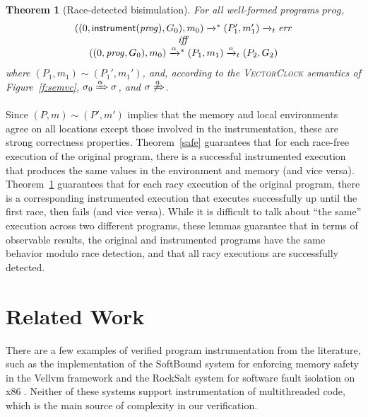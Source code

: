 \documentclass[preprint, 10pt]{sigplanconf}
\newcommand{\VCalg}{\textsc{VectorClock}\xspace}
\newcommand{\instrp}[1]{\ensuremath{\mathsf{instrument}(#1)}}
\newcommand{\cfg}[2]{\ensuremath{(#1, #2)}}
\newcommand{\execstar}[4]{\ensuremath{\cfg{#1}{#2} \tto{#3} #4}}
\newcommand{\execs}[3]{\ensuremath{ \xrightarrow{#2}_{#1} #3}}
\newcommand{\tto}[1]{\mathrel{
  \vphantom{\xrightarrow{#1}}
  \smash{\xrightarrow{#1}}
  \vphantom{\to}^{*}}
}
\newtheorem{theorem}{Theorem}
\begin{document}
\begin{theorem}[Race-detected bisimulation]\label{race}For all well-formed programs $\mathit{prog}$, 
\[
\begin{array}{c}
\execstar{(0, \instrp{\mathit{prog}}, G_0)}{m_0}{}{(P_1', m_1')} \execs{t}{}{\mathit{err}}\\ 
\mathit{iff} \\ 
\execstar{(0, \mathit{prog}, G_0)}{m_0}{\alpha}{(P_1, m_1)} \execs{t}{o}{(P_2, G_2)}
\end{array}
\]
%
where $(P_1, m_1) \sim (P_1', m_1')$, and, according to the \VCalg semantics of Figure~\ref{f:semvc}, $\sigma_0 \xRightarrow{\alpha} \sigma$, and $\sigma \not\xRightarrow{o}$.

\end{theorem}
Since $(P, m) \sim (P', m')$ implies that the memory and local environments agree on all locations except those involved in the instrumentation, these are strong correctness properties. Theorem~\ref{safe} guarantees that for each race-free execution of the original program, there is a successful instrumented execution that produces the same values in the environment and memory (and vice versa). Theorem~\ref{race} guarantees that for each racy execution of the original program, there is a corresponding instrumented execution that executes successfully up until the first race, then fails (and vice versa). While it is difficult to talk about ``the same'' execution across two different programs, these lemmas guarantee that in terms of observable results, the original and instrumented programs have the same behavior modulo race detection, and that all racy executions are successfully detected.

\section{Related Work}
\label{related}

There are a few examples of verified program instrumentation from the literature, such as
the implementation of the SoftBound system for enforcing memory safety in the Vellvm framework \cite{vellvm} and the RockSalt system for software fault isolation on x86 \cite{Morrisett:2012:RBF:2254064.2254111}. Neither of these systems support instrumentation of multithreaded code, which is the main source of complexity in our verification.
\end{document}
